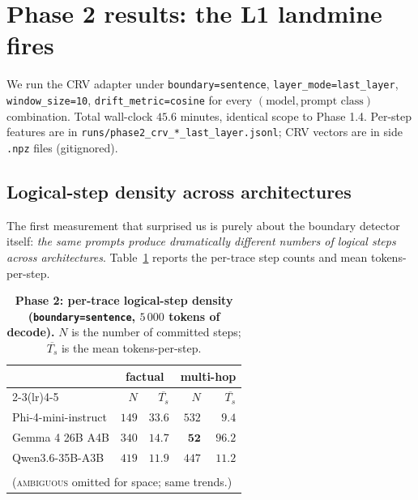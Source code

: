 \documentclass[11pt,letterpaper]{article}
\begin{document}
\section{Phase 2 results: the L1 landmine fires}
\label{sec:phase2-results}

We run the CRV adapter under \texttt{boundary=sentence},
\texttt{layer\_mode=last\_layer}, \texttt{window\_size=10},
\texttt{drift\_metric=cosine} for every
$(\text{model}, \text{prompt class})$ combination. Total wall-clock
$45.6$ minutes, identical scope to Phase 1.4. Per-step features are in
\verb|runs/phase2_crv_*_last_layer.jsonl|; CRV vectors are in side
\verb|.npz| files (gitignored).

\subsection{Logical-step density across architectures}

The first measurement that surprised us is purely about the boundary
detector itself: \emph{the same prompts produce dramatically different
numbers of logical steps across architectures}.
Table~\ref{tab:phase2-density} reports the per-trace step counts and
mean tokens-per-step.

\begin{table}[t]
\centering
\small
\caption{
\textbf{Phase 2: per-trace logical-step density
(\texttt{boundary=sentence}, $5\,000$ tokens of decode).}
$N$ is the number of committed steps; $\overline{T_s}$ is the mean
tokens-per-step.
}
\label{tab:phase2-density}
\begin{tabular}{lrrrr}
\toprule
& \multicolumn{2}{c}{\textbf{factual}} &
  \multicolumn{2}{c}{\textbf{multi-hop}} \\
\cmidrule(lr){2-3}\cmidrule(lr){4-5}
& $N$ & $\overline{T_s}$ & $N$ & $\overline{T_s}$ \\
\midrule
Phi-4-mini-instruct & $149$ & $33.6$ & $532$ & $9.4$ \\
Gemma 4 26B A4B & $340$ & $14.7$ & $\mathbf{52}$ & $\mathbf{96.2}$ \\
Qwen3.6-35B-A3B & $419$ & $11.9$ & $447$ & $11.2$ \\
\bottomrule
\\
\multicolumn{5}{l}{(\textsc{ambiguous} omitted for space; same trends.)} \\
\end{tabular}
\end{table}
\end{document}
